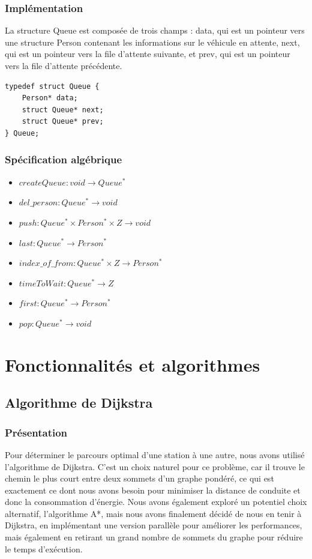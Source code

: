 \documentclass[french,a4paper]{article}
\begin{document}
\subsubsection{Implémentation}
La structure Queue est composée de trois champs : data, qui est un pointeur vers une structure Person contenant les informations sur le véhicule en attente, next, qui est un pointeur vers la file d'attente suivante, et prev, qui est un pointeur vers la file d'attente précédente. \\

\begin{center}
    \begin{lstlisting}[caption=Structure Queue]
typedef struct Queue {
    Person* data;
    struct Queue* next;
    struct Queue* prev;
} Queue;
    \end{lstlisting}
\end{center}


\subsubsection{Spécification algébrique}
\begin{itemize}
    \item $createQueue : void \rightarrow Queue^*$
    \item $del\_person : Queue^* \rightarrow void$
    \item $push : Queue^* \times Person^* \times {Z} \rightarrow void$
    \item $last : Queue^* \rightarrow Person^*$
    \item $index\_of\_from : Queue^* \times {Z} \rightarrow Person^*$
    \item $timeToWait : Queue^* \rightarrow {Z}$
    \item $first : Queue^* \rightarrow Person^*$
    \item $pop : Queue^* \rightarrow void$
\end{itemize}

\section{Fonctionnalités et algorithmes}
\subsection{Algorithme de Dijkstra}
\subsubsection{Présentation}
Pour déterminer le parcours optimal d'une station à une autre, nous avons utilisé l'algorithme de Dijkstra. C'est un choix naturel pour ce problème, car il trouve le chemin le plus court entre deux sommets d'un graphe pondéré, ce qui est exactement ce dont nous avons besoin pour minimiser la distance de conduite et donc la consommation d'énergie. Nous avons également exploré un potentiel choix alternatif, l'algorithme A*, mais nous avons finalement décidé de nous en tenir à Dijkstra, en implémentant une version parallèle pour améliorer les performances, mais également en retirant un grand nombre de sommets du graphe pour réduire le temps d'exécution.
\end{document}
